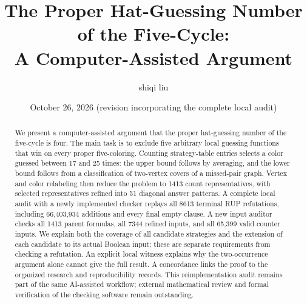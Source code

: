 \documentclass[11pt,reqno]{amsart}
\title[Proper hat guessing on the five-cycle]{The Proper Hat-Guessing Number of the Five-Cycle:\\A Computer-Assisted Argument}
\author{shiqi liu}
\date{October 26, 2026 (revision incorporating the complete local audit)}
\theoremstyle{definition}
\numberwithin{equation}{section}
\begin{document}
\begin{abstract}
We present a computer-assisted argument that the proper hat-guessing
number of the five-cycle is four. The main task is to exclude five arbitrary
local guessing functions that win on every proper five-coloring.
Counting strategy-table entries selects a color guessed between 17 and
25 times: the upper bound follows by averaging, and the lower bound follows
from a classification of two-vertex covers of a missed-pair graph.
Vertex and color relabeling then reduce the problem to 1413 count
representatives, with selected representatives refined into 51 diagonal
answer patterns. A complete local audit with a newly implemented checker
replays all 8613 terminal RUP refutations, including 66,403,934 additions
and every final empty clause. A new input auditor checks all 1413 parent
formulas, all 7344 refined inputs, and all 65,399 valid counter inputs. We explain both
the coverage of all candidate strategies and the extension of each
candidate to its actual Boolean input; these are separate requirements
from checking a refutation. An explicit local witness explains why the
two-occurrence argument alone cannot give the full result. A concordance
links the proof to the organized research and reproducibility records.
This reimplementation audit remains part of the same AI-assisted workflow;
external mathematical review and formal verification of the checking
software remain outstanding.
\end{abstract}
\maketitle







\appendix




\end{document}
